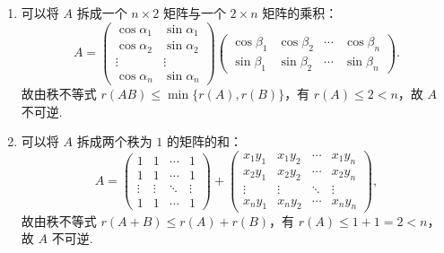\documentclass[UTF8,12pt,a4paper,fontset=fandol]{ctexart}
\begin{document}
\begin{solve}
\begin{enumerate}
                \item 可以将 $A$ 拆成一个 $n \times 2$ 矩阵与一个 $2 \times n$ 矩阵的乘积：
                    \[
                        A = \begin{pmatrix}
                            \cos \alpha_1 & \sin \alpha_1 \\
                            \cos \alpha_2 & \sin \alpha_2 \\
                            \vdots        & \vdots        \\
                            \cos \alpha_n & \sin \alpha_n
                        \end{pmatrix} \begin{pmatrix}
                            \cos \beta_1 & \cos \beta_2 & \cdots & \cos \beta_n \\
                            \sin \beta_1 & \sin \beta_2 & \cdots & \sin \beta_n
                        \end{pmatrix}.
                    \]
                    故由秩不等式 $r(AB) \leqslant \min\{r(A), r(B)\}$，有 $r(A) \leqslant 2 < n$，故 $A$ 不可逆.

                \item 可以将 $A$ 拆成两个秩为 $1$ 的矩阵的和：
                    \[
                        A = \begin{pmatrix}
                            1      & 1      & \cdots & 1      \\
                            1      & 1      & \cdots & 1      \\
                            \vdots & \vdots & \ddots & \vdots \\
                            1      & 1      & \cdots & 1
                        \end{pmatrix} + \begin{pmatrix}
                            x_1 y_1 & x_1 y_2 & \cdots & x_1 y_n \\
                            x_2 y_1 & x_2 y_2 & \cdots & x_2 y_n \\
                            \vdots  & \vdots  & \ddots & \vdots  \\
                            x_n y_1 & x_n y_2 & \cdots & x_n y_n
                        \end{pmatrix},
                    \]
                    故由秩不等式 $r(A+B) \leqslant r(A)+r(B)$，有 $r(A) \leqslant 1 + 1 = 2 < n$，故 $A$ 不可逆.
            \end{enumerate}
\end{solve}
\end{document}
